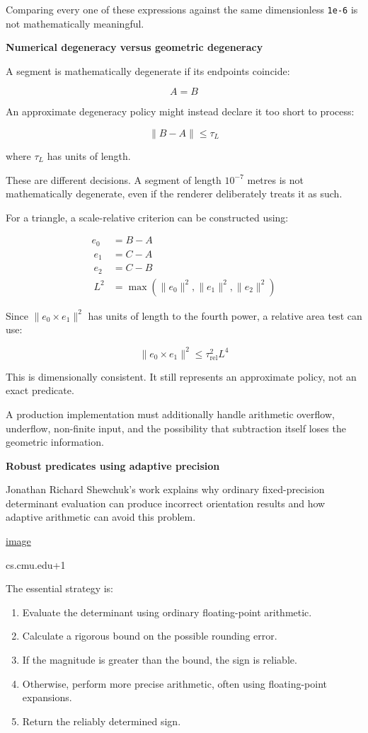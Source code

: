 Comparing every one of these expressions against the same dimensionless \texttt{1e-6} is not mathematically meaningful.

\textbf{Numerical degeneracy versus geometric degeneracy}

A segment is mathematically degenerate if its endpoints coincide:

\[
A=B
\]

An approximate degeneracy policy might instead declare it too short to process:

\[
\|B-A\|\le \tau_L
\]

where \(\tau_L\) has units of length.

These are different decisions. A segment of length \(10^{-7}\) metres is not mathematically degenerate, even if the renderer deliberately treats it as such.

For a triangle, a scale-relative criterion can be constructed using:

\[
\begin{aligned} e_0&=B-A\\\ e_1&=C-A\\\ e_2&=C-B\\\ L^2&=\max(\|e_0\|^2,\|e_1\|^2,\|e_2\|^2) \end{aligned}
\]

Since \(\|e_0\times e_1\|^2\) has units of length to the fourth power, a relative area test can use:

\[
\|e_0\times e_1\|^2 \le \tau_{\mathrm{rel}}^2L^4
\]

This is dimensionally consistent. It still represents an approximate policy, not an exact predicate.

A production implementation must additionally handle arithmetic overflow, underflow, non-finite input, and the possibility that subtraction itself loses the geometric information.

\textbf{Robust predicates using adaptive precision}

Jonathan Richard Shewchuk's work explains why ordinary fixed-precision determinant evaluation can produce incorrect orientation results and how adaptive arithmetic can avoid this problem. 

\href{https://www.google.com/s2/favicons?domain=https://www.cs.cmu.edu&sz=32}{image}

cs.cmu.edu+1

The essential strategy is:

\begin{enumerate}
\def\labelenumi{\arabic{enumi}.}
\tightlist
\item
  Evaluate the determinant using ordinary floating-point arithmetic.
\item
  Calculate a rigorous bound on the possible rounding error.
\item
  If the magnitude is greater than the bound, the sign is reliable.
\item
  Otherwise, perform more precise arithmetic, often using floating-point expansions.
\item
  Return the reliably determined sign.
\end{enumerate}

